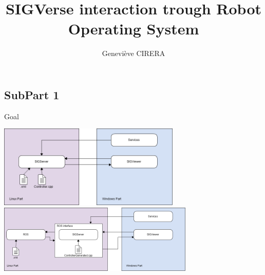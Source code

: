 \documentclass[11pt]{beamer}
\title{SIGVerse interaction trough Robot Operating System}
\author{Geneviève CIRERA}\institute{Polytech'Nice-Sophia}
\date{\oldstylenums{\today}}
\begin{document}
\begin{frame}
\titlepage
\end{frame}



\section{}

\subsection*{SubPart 1}

\begin{frame}{Goal}
		\begin{center}
		
		
			\includegraphics[width=0.65\textwidth]{images/SIGVerseSimple.png}\\
			\vspace{0.3cm}
			\includegraphics[width=0.7\textwidth]{images/SIGVerseROS.png}	
			\end{center}
\end{frame}
\end{document}
